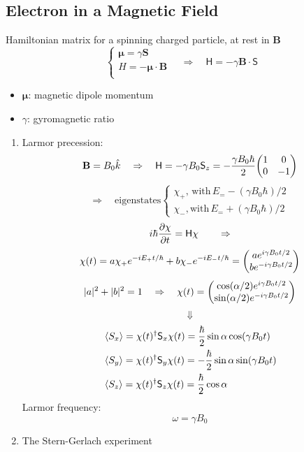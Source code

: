 \subsection{Electron in a Magnetic Field}
Hamiltonian matrix for a spinning charged particle, at rest in \(\mathbf{B}\)
\[\begin{cases}
       \boldsymbol{\mu}=\gamma\mathbf{S} \\
       H = -\boldsymbol{\mu}\cdot\mathbf{B} \\
\end{cases} \quad
       \Rightarrow\quad\mathsf{H} = -\gamma\mathbf{B}\cdot\mathsf{S}\]
\begin{itemize}
       \item \(\boldsymbol{\mu}\): magnetic dipole momentum
       \item \(\gamma\): gyromagnetic ratio 
\end{itemize}
\begin{enumerate}
       \item Larmor precession:
       \[\mathbf{B}=B_0\hat{k}\quad\Rightarrow\quad \mathsf{H}=-\gamma B_0\mathsf{S}_z=-\frac{\gamma B_0\hbar}{2}\mqty(1 & 0 \\ 0 & -1)\]
       \[\Rightarrow\quad\text{eigenstates} \begin{cases}
              \chi_+,\, \text{with}\, E_=-(\gamma B_0\hbar)/2 \\
              \chi_-, \text{with}\, E_=+(\gamma B_0\hbar)/2 
       \end{cases}\]
       \[i\hbar\pdv{\chi}{t}=\mathsf{H}\chi \qquad\Rightarrow\]
       \[\chi(t) = a\chi_+e^{-iE_+t/\hbar}+b\chi_-e^{-iE_-t/\hbar}=\mqty(ae^{i\gamma B_0t/2} \\ be^{-i\gamma B_0t/2})\]
       \[|a|^2+|b|^2=1\quad\Rightarrow\quad
       \chi(t) = \mqty(\cos(\alpha/2)e^{i\gamma B_0t/2} \\ \sin(\alpha/2)e^{-i\gamma B_0t/2})\]
       \[\Downarrow\]
       \[\begin{aligned}
              &\expval{S_x} = \chi(t)^\dagger \mathsf{S}_x\chi(t) = \frac{\hbar}{2}\sin\alpha\cos(\gamma B_0t) \\
              &\expval{S_y} = \chi(t)^\dagger \mathsf{S}_y\chi(t) = -\frac{\hbar}{2}\sin\alpha\sin(\gamma B_0t) \\
              &\expval{S_z} = \chi(t)^\dagger \mathsf{S}_z\chi(t) = \frac{\hbar}{2}\cos\alpha\\
       \end{aligned}\]
       Larmor frequency: \[\omega = \gamma B_0\]
       \item The Stern-Gerlach experiment
\end{enumerate}


